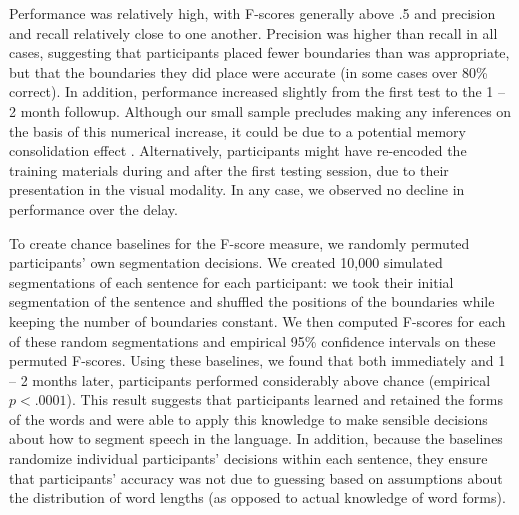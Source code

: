 \documentclass[10pt]{article}
\begin{document}
Performance was relatively high, with F-scores generally above .5 and precision and recall relatively close to one another. Precision was higher than recall in all cases, suggesting that participants placed fewer boundaries than was appropriate, but that the boundaries they did place were accurate (in some cases over 80\% correct). In addition, performance increased slightly from the first test to the 1 -- 2 month followup. Although our small sample precludes making any inferences on the basis of this numerical increase, it could be due to a potential memory consolidation effect \cite{mcgaugh2000}. Alternatively, participants might have re-encoded the training materials during and after the first testing session, due to their presentation in the visual modality. In any case, we observed no decline in performance over the delay.

To create chance baselines for the F-score measure, we randomly permuted participants' own segmentation decisions. We created 10,000 simulated segmentations of each sentence for each participant: we took their initial segmentation of the sentence and shuffled the positions of the boundaries while keeping the number of boundaries constant. We then computed F-scores for each of these random segmentations and empirical 95\% confidence intervals on these permuted F-scores. Using these baselines, we found that both immediately and 1 -- 2 months later, participants performed considerably above chance (empirical $p < .0001$). This result suggests that participants learned and retained the forms of the words and were able to apply this knowledge to make sensible decisions about how to segment speech in the language. In addition, because the baselines randomize individual participants' decisions within each sentence, they ensure that participants' accuracy was not due to guessing based on assumptions about the distribution of word lengths (as opposed to actual knowledge of word forms). 
\end{document}

